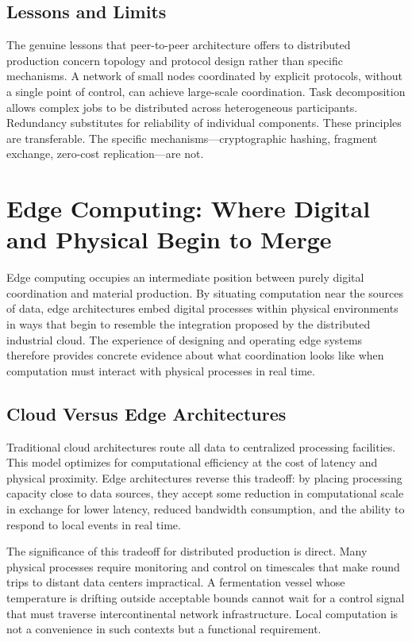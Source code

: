 \documentclass[12pt]{book}
\theoremstyle{definition}
\theoremstyle{remark}
\begin{document}
\section{Lessons and Limits}

The genuine lessons that peer-to-peer architecture offers to
distributed production concern topology and protocol design rather
than specific mechanisms. A network of small nodes coordinated by
explicit protocols, without a single point of control, can achieve
large-scale coordination. Task decomposition allows complex jobs to
be distributed across heterogeneous participants. Redundancy
substitutes for reliability of individual components. These
principles are transferable. The specific mechanisms---cryptographic
hashing, fragment exchange, zero-cost replication---are not.

\chapter{Edge Computing: Where Digital and Physical Begin to Merge}

Edge computing occupies an intermediate position between purely
digital coordination and material production. By situating
computation near the sources of data, edge architectures embed
digital processes within physical environments in ways that begin to
resemble the integration proposed by the distributed industrial cloud.
The experience of designing and operating edge systems therefore
provides concrete evidence about what coordination looks like when
computation must interact with physical processes in real time.

\section{Cloud Versus Edge Architectures}

Traditional cloud architectures route all data to centralized
processing facilities. This model optimizes for computational
efficiency at the cost of latency and physical proximity. Edge
architectures reverse this tradeoff: by placing processing capacity
close to data sources, they accept some reduction in computational
scale in exchange for lower latency, reduced bandwidth consumption,
and the ability to respond to local events in real time.

The significance of this tradeoff for distributed production is
direct. Many physical processes require monitoring and control on
timescales that make round trips to distant data centers impractical.
A fermentation vessel whose temperature is drifting outside acceptable
bounds cannot wait for a control signal that must traverse
intercontinental network infrastructure. Local computation is not a
convenience in such contexts but a functional requirement.
\end{document}
